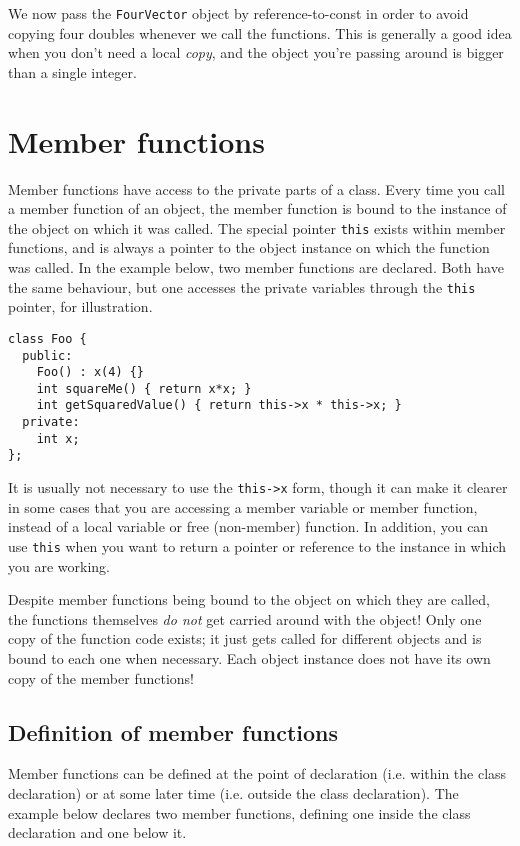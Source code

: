 \documentclass[a4paper]{scrartcl}
\begin{document}
We now pass the \verb|FourVector| object by reference-to-const in order to avoid copying four doubles whenever we call the functions. This is generally a good idea when you don't need a local \emph{copy}, and the object you're passing around is bigger than a single integer.

\section{Member functions}
Member functions have access to the private parts of a class. Every time you call a member function of an object, the member function is bound to the instance of the object on which it was called. The special pointer \verb|this| exists within member functions, and is always a pointer to the object instance on which the function was called. In the example below, two member functions are declared. Both have the same behaviour, but one accesses the private variables through the \verb|this| pointer, for illustration.

\begin{verbatim}
class Foo {
  public:
    Foo() : x(4) {}
    int squareMe() { return x*x; }
    int getSquaredValue() { return this->x * this->x; }
  private:
    int x;
};
\end{verbatim}

It is usually not necessary to use the \verb|this->x| form, though it can make it clearer in some cases that you are accessing a member variable or member function, instead of a local variable or free (non-member) function. In addition, you can use \verb|this| when you want to return a pointer or reference to the instance in which you are working.

Despite member functions being bound to the object on which they are called, the functions themselves \emph{do not} get carried around with the object! Only one copy of the function code exists; it just gets called for different objects and is bound to each one when necessary. Each object instance does not have its own copy of the member functions!

\subsection{Definition of member functions}
Member functions can be defined at the point of declaration (i.e. within the class declaration) or at some later time (i.e. outside the class declaration). The example below declares two member functions, defining one inside the class declaration and one below it.
\end{document}
